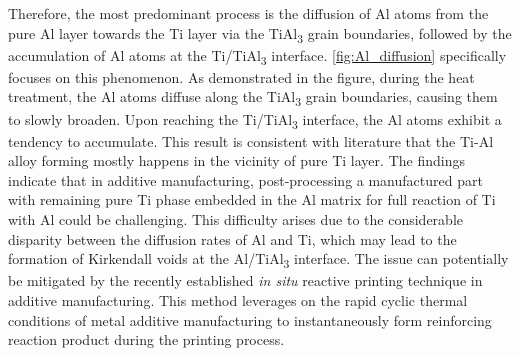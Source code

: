 Therefore, the most predominant process is the diffusion of Al atoms from the pure Al layer towards the Ti layer via the TiAl\textsubscript{3} grain boundaries, followed by the accumulation of Al atoms at the Ti/TiAl\textsubscript{3} interface. \cref{fig:Al_diffusion} specifically focuses on this phenomenon. As demonstrated in the figure, during the heat treatment, the Al atoms diffuse along the TiAl\textsubscript{3} grain boundaries, causing them to slowly broaden. Upon reaching the Ti/TiAl\textsubscript{3} interface, the Al atoms exhibit a tendency to accumulate. This result is consistent with literature that the Ti-Al alloy forming mostly happens in the vicinity of pure Ti layer.\cite{thiyaneshwaran2018nucleation} The findings indicate that in additive manufacturing, post-processing a manufactured part with remaining pure Ti phase embedded in the Al matrix for full reaction of Ti with Al could be challenging. This difficulty arises due to the considerable disparity between the diffusion rates of Al and Ti, which may lead to the formation of Kirkendall voids at the Al/TiAl\textsubscript{3} interface. The issue can potentially be mitigated by the recently established \textit{in situ} reactive printing technique in additive manufacturing.\cite{tian2022situ} This method leverages on the rapid cyclic thermal conditions of metal additive manufacturing to instantaneously form reinforcing reaction product during the printing process.



